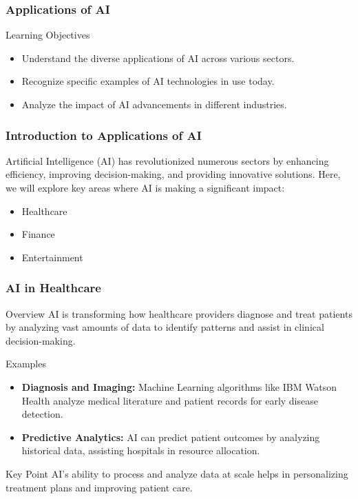 \documentclass[aspectratio=169]{beamer}
\begin{document}
\begin{frame}[fragile]
    \frametitle{Applications of AI}
    \begin{block}{Learning Objectives}
        \begin{itemize}
            \item Understand the diverse applications of AI across various sectors.
            \item Recognize specific examples of AI technologies in use today.
            \item Analyze the impact of AI advancements in different industries.
        \end{itemize}
    \end{block}
\end{frame}

\begin{frame}[fragile]
    \frametitle{Introduction to Applications of AI}
    Artificial Intelligence (AI) has revolutionized numerous sectors by enhancing efficiency, improving decision-making, and providing innovative solutions. Here, we will explore key areas where AI is making a significant impact:
    \begin{itemize}
        \item Healthcare
        \item Finance
        \item Entertainment
    \end{itemize}
\end{frame}

\begin{frame}[fragile]
    \frametitle{AI in Healthcare}
    \begin{block}{Overview}
        AI is transforming how healthcare providers diagnose and treat patients by analyzing vast amounts of data to identify patterns and assist in clinical decision-making.
    \end{block}
    
    \begin{block}{Examples}
        \begin{itemize}
            \item \textbf{Diagnosis and Imaging:} Machine Learning algorithms like IBM Watson Health analyze medical literature and patient records for early disease detection.
            \item \textbf{Predictive Analytics:} AI can predict patient outcomes by analyzing historical data, assisting hospitals in resource allocation.
        \end{itemize}
    \end{block}

    \begin{block}{Key Point}
        AI's ability to process and analyze data at scale helps in personalizing treatment plans and improving patient care.
    \end{block}
\end{frame}
\end{document}
